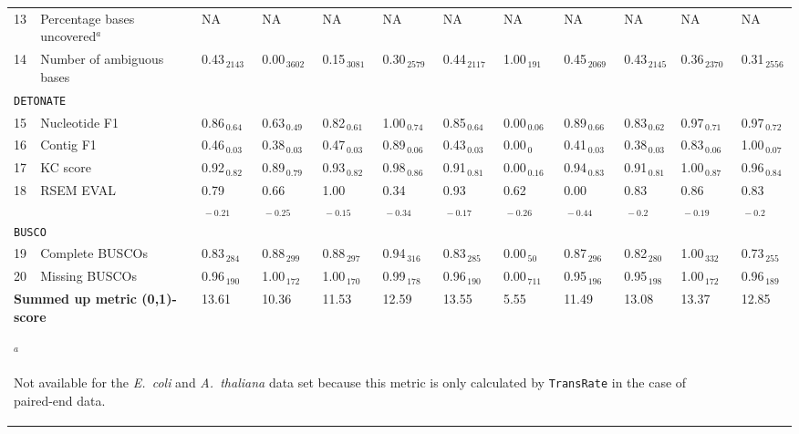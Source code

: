 \documentclass{scrartcl}
\begin{document}
\begin{landscape}
\begin{table}
\begin{scriptsize}
\begin{tabular}{llllllllllll}
13 & Percentage bases uncovered$^{a}$  & NA & NA & NA & NA & NA & NA & NA & NA & NA & NA\\ 
14 & Number of ambiguous bases  & 0.43$_{\,2143}$ & 0.00$_{\,3602}$ & 0.15$_{\,3081}$ & 0.30$_{\,2579}$ & 0.44$_{\,2117}$ & 1.00$_{\,191}$ & 0.45$_{\,2069}$ & 0.43$_{\,2145}$ & 0.36$_{\,2370}$ & 0.31$_{\,2556}$ \\\midrule
\multicolumn{11}{l}{\texttt{DETONATE}}\\ 
\midrule
15 & Nucleotide F1  & 0.86$_{\,0.64}$ & 0.63$_{\,0.49}$ & 0.82$_{\,0.61}$ & 1.00$_{\,0.74}$ & 0.85$_{\,0.64}$ & 0.00$_{\,0.06}$ & 0.89$_{\,0.66}$ & 0.83$_{\,0.62}$ & 0.97$_{\,0.71}$ & 0.97$_{\,0.72}$ \\16 & Contig F1  & 0.46$_{\,0.03}$ & 0.38$_{\,0.03}$ & 0.47$_{\,0.03}$ & 0.89$_{\,0.06}$ & 0.43$_{\,0.03}$ & 0.00$_{\,0}$ & 0.41$_{\,0.03}$ & 0.38$_{\,0.03}$ & 0.83$_{\,0.06}$ & 1.00$_{\,0.07}$ \\17 & KC score  & 0.92$_{\,0.82}$ & 0.89$_{\,0.79}$ & 0.93$_{\,0.82}$ & 0.98$_{\,0.86}$ & 0.91$_{\,0.81}$ & 0.00$_{\,0.16}$ & 0.94$_{\,0.83}$ & 0.91$_{\,0.81}$ & 1.00$_{\,0.87}$ & 0.96$_{\,0.84}$ \\18 & RSEM EVAL  & 0.79$_{\,-0.21}$ & 0.66$_{\,-0.25}$ & 1.00$_{\,-0.15}$ & 0.34$_{\,-0.34}$ & 0.93$_{\,-0.17}$ & 0.62$_{\,-0.26}$ & 0.00$_{\,-0.44}$ & 0.83$_{\,-0.2}$ & 0.86$_{\,-0.19}$ & 0.83$_{\,-0.2}$ \\\midrule
\multicolumn{11}{l}{\texttt{BUSCO}}\\ 
\midrule
19 & Complete BUSCOs  & 0.83$_{\,284}$ & 0.88$_{\,299}$ & 0.88$_{\,297}$ & 0.94$_{\,316}$ & 0.83$_{\,285}$ & 0.00$_{\,50}$ & 0.87$_{\,296}$ & 0.82$_{\,280}$ & 1.00$_{\,332}$ & 0.73$_{\,255}$ \\20 & Missing BUSCOs  & 0.96$_{\,190}$ & 1.00$_{\,172}$ & 1.00$_{\,170}$ & 0.99$_{\,178}$ & 0.96$_{\,190}$ & 0.00$_{\,711}$ & 0.95$_{\,196}$ & 0.95$_{\,198}$ & 1.00$_{\,172}$ & 0.96$_{\,189}$ \\\midrule
\multicolumn{2}{l}{\textbf{Summed up metric (0,1)-score}}&13.61&10.36&11.53&12.59&13.55&5.55&11.49&13.08&13.37&12.85\\\bottomrule
\multicolumn{11}{l}{$^{a}$\begin{scriptsize}Not available for the \emph{E.~coli} and \emph{A.~thaliana} data set because this metric is only calculated by \texttt{TransRate} in the case of paired-end data.\end{scriptsize}}\\\end{tabular}\end{scriptsize}
\end{table}
\end{landscape}
\end{document}

